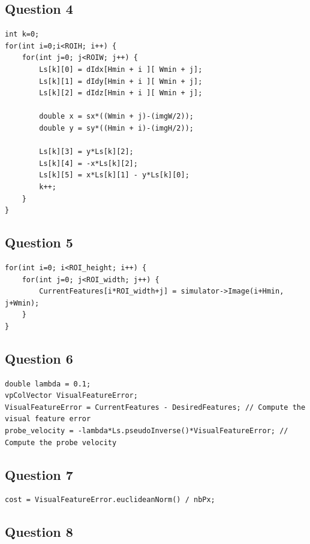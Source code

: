 \documentclass[a4paper,11pt]{article}
\begin{document}
\subsection{Question 4}
\begin{verbatim}
int k=0;
for(int i=0;i<ROIH; i++) {
	for(int j=0; j<ROIW; j++) {
		Ls[k][0] = dIdx[Hmin + i ][ Wmin + j];
        Ls[k][1] = dIdy[Hmin + i ][ Wmin + j];
        Ls[k][2] = dIdz[Hmin + i ][ Wmin + j];

        double x = sx*((Wmin + j)-(imgW/2));
        double y = sy*((Hmin + i)-(imgH/2));

        Ls[k][3] = y*Ls[k][2];
        Ls[k][4] = -x*Ls[k][2];
        Ls[k][5] = x*Ls[k][1] - y*Ls[k][0];
        k++;
	}
}
\end{verbatim}

\subsection{Question 5}
\begin{verbatim}
for(int i=0; i<ROI_height; i++) {
	for(int j=0; j<ROI_width; j++) {
		CurrentFeatures[i*ROI_width+j] = simulator->Image(i+Hmin, j+Wmin);
	}
}
\end{verbatim}

\subsection{Question 6}
\begin{verbatim}
double lambda = 0.1;
vpColVector VisualFeatureError;
VisualFeatureError = CurrentFeatures - DesiredFeatures; // Compute the visual feature error
probe_velocity = -lambda*Ls.pseudoInverse()*VisualFeatureError; // Compute the probe velocity
\end{verbatim}

\subsection{Question 7}
\begin{verbatim}
cost = VisualFeatureError.euclideanNorm() / nbPx;
\end{verbatim}

\subsection{Question 8}
\end{document}
